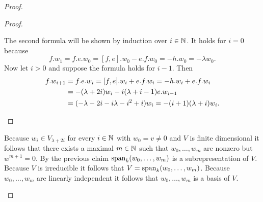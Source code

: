 \begin{proof}
\begin{enumerate}[leftmargin=*]
\begin{proof}
\begin{enumerate}[leftmargin=*]
      The second formula will be shown by induction over $i \in \mathbb{N}$. It holds for $i = 0$ because
      \[
       f.w_1
       = f.e.w_0
       = [f,e].w_0 - e.f.w_0
       = -h.w_0
       = -\lambda w_0.
      \]
      Now let $i > 0$ and suppose the formula holds for $i-1$. Then
      \begin{align*}
       f.w_{i+1}
       &= f.e.w_i
       = [f,e].w_i + e.f.w_i
       = -h.w_i + e.f.w_i \\
       &= -(\lambda+2i) w_i -i(\lambda+i-1) e.w_{i-1} \\
       &= (-\lambda -2i -i\lambda -i^2 +i) w_i
       =  -(i+1)(\lambda+i) w_i.
      \qedhere
      \end{align*}

     \qedhere
    \end{enumerate}
   \end{proof}
   
   Because $w_i \in V_{\lambda+2i}$ for every $i \in \mathbb{N}$ with $w_0 = v \neq 0$ and $V$ is finite dimensional it follows that there exists a maximal $m \in \mathbb{N}$ such that $w_0, \dotsc, w_m$ are nonzero but $w^{m+1} = 0$. By the previous claim $\operatorname{span}_k(w_0, \dotsc, w_m)$ is a subrepresentation of $V$. Because $V$ is irreducible it follows that $V = \operatorname{span}_k(w_0, \dotsc, w_m)$. Because $w_0, \dotsc, w_m$ are linearly independent it follows that $w_0, \dotsc, w_m$ is a basis of $V$.
   

\end{enumerate}
\end{proof}
